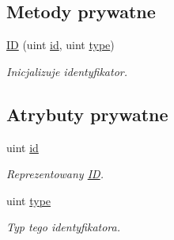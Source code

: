 \subsection*{Metody prywatne}
\begin{DoxyCompactItemize}
\item 
\hyperlink{classIDGenerator_1_1ID_af7801ab8a1caefa26b551274e5e0530b}{ID} (uint \hyperlink{classIDGenerator_1_1ID_a284b4a6d5b96b758a3ba11b5539d0878}{id}, uint \hyperlink{classIDGenerator_1_1ID_a336d735ce48e2bca744bc7d77c6792af}{type})
\begin{DoxyCompactList}\small\item\em Inicjalizuje identyfikator. \item\end{DoxyCompactList}\end{DoxyCompactItemize}
\subsection*{Atrybuty prywatne}
\begin{DoxyCompactItemize}
\item 
uint \hyperlink{classIDGenerator_1_1ID_a284b4a6d5b96b758a3ba11b5539d0878}{id}
\begin{DoxyCompactList}\small\item\em Reprezentowany \hyperlink{classIDGenerator_1_1ID}{ID}. \item\end{DoxyCompactList}\item 
uint \hyperlink{classIDGenerator_1_1ID_a336d735ce48e2bca744bc7d77c6792af}{type}
\begin{DoxyCompactList}\small\item\em Typ tego identyfikatora. \item\end{DoxyCompactList}\end{DoxyCompactItemize}
